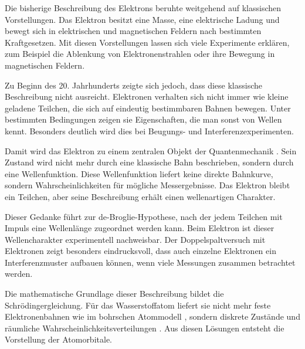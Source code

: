 Die bisherige Beschreibung des Elektrons beruhte weitgehend auf
klassischen Vorstellungen. Das Elektron besitzt eine Masse, eine
elektrische Ladung und bewegt sich in elektrischen
und magnetischen Feldern
nach bestimmten Kraftgesetzen. Mit diesen Vorstellungen lassen sich viele
Experimente erklären, zum Beispiel die Ablenkung von Elektronenstrahlen
 oder ihre Bewegung in magnetischen Feldern.

Zu Beginn des 20. Jahrhunderts zeigte sich jedoch, dass diese klassische
Beschreibung nicht ausreicht. Elektronen verhalten sich nicht immer wie kleine
geladene Teilchen, die sich auf eindeutig bestimmbaren Bahnen
 bewegen. Unter bestimmten Bedingungen zeigen sie Eigenschaften,
die man sonst von Wellen kennt. Besonders deutlich wird dies bei
Beugungs- und Interferenzexperimenten.

Damit wird das Elektron zu einem zentralen Objekt der Quantenmechanik
. Sein Zustand
wird nicht mehr durch eine klassische Bahn beschrieben, sondern durch eine
Wellenfunktion. Diese Wellenfunktion liefert keine direkte
Bahnkurve, sondern Wahrscheinlichkeiten für mögliche
Messergebnisse. Das Elektron bleibt ein Teilchen, aber seine
Beschreibung erhält einen wellenartigen Charakter.

Dieser Gedanke führt zur de-Broglie-Hypothese,
nach der jedem Teilchen mit Impuls eine Wellenlänge
 zugeordnet werden kann. Beim Elektron ist dieser
Wellencharakter experimentell nachweisbar. Der
Doppelspaltversuch mit Elektronen zeigt besonders
eindrucksvoll, dass auch einzelne Elektronen ein Interferenzmuster
 aufbauen können, wenn viele Messungen zusammen
betrachtet werden.

Die mathematische Grundlage dieser Beschreibung bildet die
Schrödingergleichung. Für das Wasserstoffatom
 liefert sie nicht mehr feste Elektronenbahnen
 wie im bohrschen Atommodell
, sondern diskrete Zustände
 und räumliche Wahrscheinlichkeitsverteilungen
. Aus diesen Lösungen entsteht die
Vorstellung der Atomorbitale.

